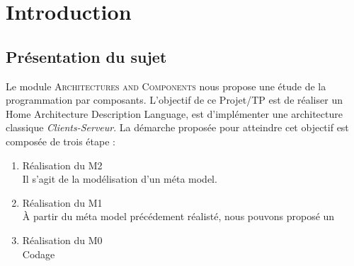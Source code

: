 \chapter{Introduction}

\section{Présentation du sujet}
Le module \textsc{Architectures and Components} nous propose une étude de la programmation par composants. L'objectif de ce Projet/TP  est de réaliser un Home Architecture Description Language, est d'implémenter une architecture classique \emph{Clients-Serveur}. La démarche proposée pour atteindre cet objectif est composée de trois étape : 
\begin{enumerate}
\item 
Réalisation du M2 \hfill \\
Il s'agit de la modélisation d'un méta model.  
\item
Réalisation du M1 \hfill \\
À partir du méta model précédement réalisté, nous pouvons proposé un 
\item
Réalisation du M0 \hfill \\
Codage
\end{enumerate}
